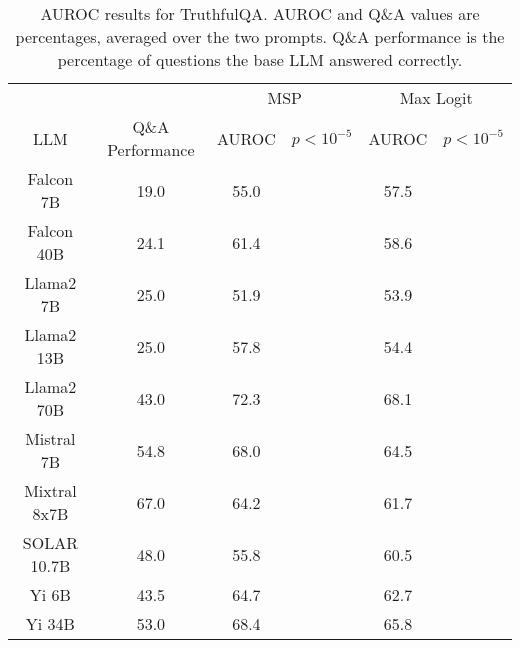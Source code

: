 \begin{table*}
\centering
\begin{tabular}{c|c|c|c|c|c}
& & \multicolumn{2}{c|}{MSP} & \multicolumn{2}{c}{Max Logit} \\ 
LLM & Q\&A Performance & AUROC & $p < 10^{-5}$ & AUROC & $p < 10^{-5}$\\ \hline
Falcon 7B & 19.0 & 55.0 &  & 57.5 & \\
Falcon 40B & 24.1 & 61.4 &  & 58.6 & \\
Llama2 7B & 25.0 & 51.9 &  & 53.9 & \\
Llama2 13B & 25.0 & 57.8 &  & 54.4 & \\
Llama2 70B & 43.0 & 72.3 &  & 68.1 & \\
Mistral 7B & 54.8 & 68.0 &  & 64.5 & \\
Mixtral 8x7B & 67.0 & 64.2 &  & 61.7 & \\
SOLAR 10.7B & 48.0 & 55.8 &  & 60.5 & \\
Yi 6B & 43.5 & 64.7 &  & 62.7 & \\
Yi 34B & 53.0 & 68.4 &  & 65.8 & \\
\hline
\end{tabular}
\caption{AUROC results for TruthfulQA. AUROC and Q\&A values are percentages, averaged over the two prompts. Q\&A performance is the percentage of questions the base LLM answered correctly.}
\label{tab:truthfulqa_auroc}
\end{table*}
